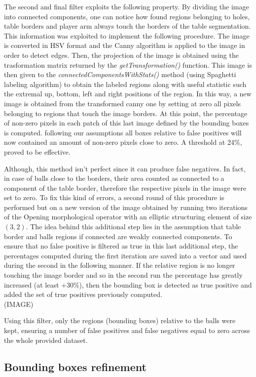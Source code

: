 The second and final filter exploits the following property. By dividing the image into connected components, one can notice how found regions belonging to holes, table borders and player arm always
touch the borders of the table segmentation. This information was exploited to implement the following procedure.
The image is converted in HSV format and the Canny algorithm is applied to the image in order to detect edges.
Then, the projection of the image is obtained using the trasformation matrix returned by the \textit{getTransformation()} function.
This image is then given to the \textit{connectedComponentsWithStats()} method (using Spaghetti labeling algorithm) to obtain
the labeled regions along with useful statistic such the extremal up, bottom, left and right positions of the region.
In this way, a new image is obtained from the transformed canny one by setting at zero all pixels belonging to regions that touch the image
borders.
At this point, the percentage of non-zero pixels in each patch of this last image defined by the bounding boxes is computed.
following our assumptions all boxes relative to false positives will now contained an amount of non-zero pixels close to zero.
A threshold at 24\%, proved to be effective.

Although, this method isn't perfect since it can produce false negatives. In fact, in case of balls close to the borders, their area counted as connected to a component 
of the table border, therefore the respective pixels in the image were set to zero. To fix this kind of errors, a second round of this
procedure is performed but on a new version of the image obtained by running two iterations of the Opening morphological operator with an elliptic 
structuring element of size $(3,2)$. The idea behind this additional step lies in the assumption that table border and balls regions if connected
are weakly connected components. To ensure that no false positive is filtered as true in this last additional step, the percentages
computed during the first iteration are saved into a vector and used during the second in the following manner. If the relative region is no longer touching the image border
and so in the second run the percentage has greatly increased (at least +30\%), then the bounding box is detected as true positive and added
the set of true positives previously computed. \\
(IMAGE)

Using this filter, only the regions (bounding boxes) relative to the balls were kept, ensuring a number of false positives and false
negatives equal to zero across the whole provided dataset.


\subsection*{Bounding boxes refinement}